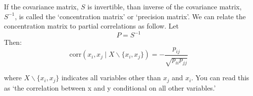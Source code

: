 If the covariance matrix, $S$ is invertible, than inverse of the
covariance matrix, $S^{-1}$, is called the `concentration matrix' or
`precision matrix'. We can relate the concentration matrix to partial
correlations as follow. Let 
\[
P = S^{-1}
\]
Then:
\[
\mbox{corr}(x_i,x_j \mid X \backslash \{x_i,x_j\}) = -\frac{p_{ij}}{\sqrt{p_{ii} p_{jj}}}
\]

where $X \backslash \{x_i,x_j\}$ indicates all variables other than
$x_j$ and $x_i$. You can read this as `the correlation between x and y
conditional on all other variables.'



